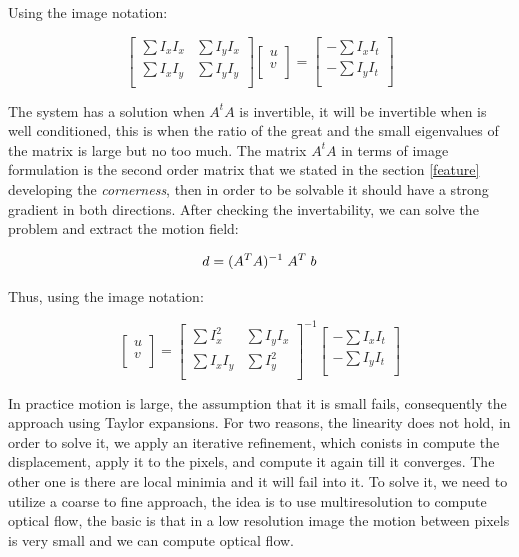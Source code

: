 \documentclass[12pt, a4paper, titlepage,twoside,openright]{article}
\begin{document}
Using the image notation:


\[
\begin{bmatrix}
    \sum I_{x}I_{x} & \sum I_{y}I_{x}  \\
    \sum I_{x}I_{y} & \sum I_{y}I_{y}   \\
\end{bmatrix}
\begin{bmatrix}
    u \\
    v \\
\end{bmatrix}
=
\begin{bmatrix}
    - \sum I_{x}I_{t} \\
    - \sum I_{y}I_{t} \\
\end{bmatrix}
\]



The system has a solution when $A^{t}A$ is invertible, it will be invertible when is well conditioned, this is when the ratio of the great and the small eigenvalues of the matrix is large but no too much. The matrix $A^{t}A$ in terms of image formulation is the second order matrix that we stated in the section \ref{feature} developing the \textit{cornerness}, then in order to be solvable it should have a strong gradient in both directions. After checking the invertability, we can solve the problem and extract the motion field:

$$ d = (A^{T}A)^{-1} \hspace{0.1cm}  A^{T}  \hspace{0.1cm} b  $$

Thus, using the image notation:

\[
\begin{bmatrix}
    u \\
    v \\
\end{bmatrix}
=
\begin{bmatrix}
    \sum I_{x}^{2} & \sum I_{y}I_{x}  \\
    \sum I_{x}I_{y} & \sum I_{y}^{2}   \\
\end{bmatrix}^{-1}
\begin{bmatrix}
    - \sum I_{x}I_{t} \\
    - \sum I_{y}I_{t} \\
\end{bmatrix}
\]



In practice motion is large, the assumption that it is small fails, consequently the approach using Taylor expansions. For two reasons, the linearity does not hold, in order to solve it, we apply an iterative refinement, which conists in compute the displacement, apply it to the pixels, and compute it again till it converges. The other one is there are local minimia and it will fail into it. To solve it, we need to utilize a coarse to fine approach, the idea is to use multiresolution to compute optical flow, the basic is that in a low resolution image the motion between pixels is very small and we can compute optical flow.
\end{document}
